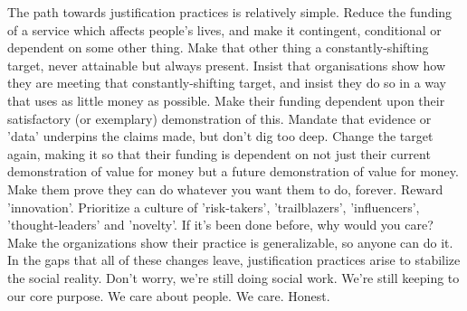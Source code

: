 The path towards justification practices is relatively simple. Reduce the funding of a service which affects people's lives, and make it contingent, conditional or dependent on some other thing. Make that other thing a constantly-shifting target, never attainable but always present. Insist that organisations show how they are meeting that constantly-shifting target, and insist they do so in a way that uses as little money as possible. Make their funding dependent upon their satisfactory (or exemplary) demonstration of this. Mandate that evidence or 'data' underpins the claims made, but don't dig too deep. Change the target again, making it so that their funding is dependent on not just their current demonstration of value for money but a future demonstration of value for money. Make them prove they can do whatever you want them to do, forever. Reward 'innovation'. Prioritize a culture of 'risk-takers', 'trailblazers', 'influencers', 'thought-leaders' and 'novelty'. If it's been done before, why would you care? Make the organizations show their practice is generalizable, so anyone can do it. In the gaps that all of these changes leave, justification practices arise to stabilize the social reality. Don't worry, we're still doing social work. We're still keeping to our core purpose. We care about people. We care. Honest.

